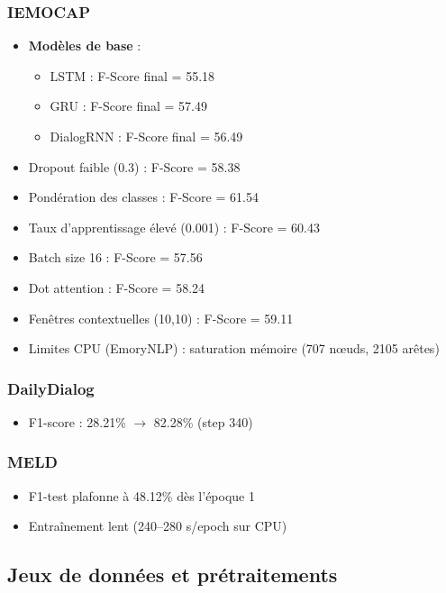 \documentclass[a4paper,11pt]{article}
\begin{document}
\subsubsection{IEMOCAP}
\begin{itemize}
  \item \textbf{Modèles de base} :
    \begin{itemize}
      \item LSTM : F-Score final = 55.18  
      \item GRU : F-Score final = 57.49  
      \item DialogRNN : F-Score final = 56.49  
    \end{itemize}
  \item Dropout faible (0.3) : F-Score = 58.38  
  \item Pondération des classes : F-Score = 61.54  
  \item Taux d'apprentissage élevé (0.001) : F-Score = 60.43  
  \item Batch size 16 : F-Score = 57.56  
  \item Dot attention : F-Score = 58.24  
  \item Fenêtres contextuelles (10,10) : F-Score = 59.11  
  \item Limites CPU (EmoryNLP) : saturation mémoire (707 nœuds, 2105 arêtes)
\end{itemize}

\subsubsection{DailyDialog}
\begin{itemize}
  \item F1-score : 28.21\% $\rightarrow$ 82.28\% (step 340)
\end{itemize}

\subsubsection{MELD}
\begin{itemize}
  \item F1-test plafonne à 48.12\% dès l'époque 1  
  \item Entraînement lent (240--280 s/epoch sur CPU)
\end{itemize}

\subsection{Jeux de données et prétraitements}
\end{document}

